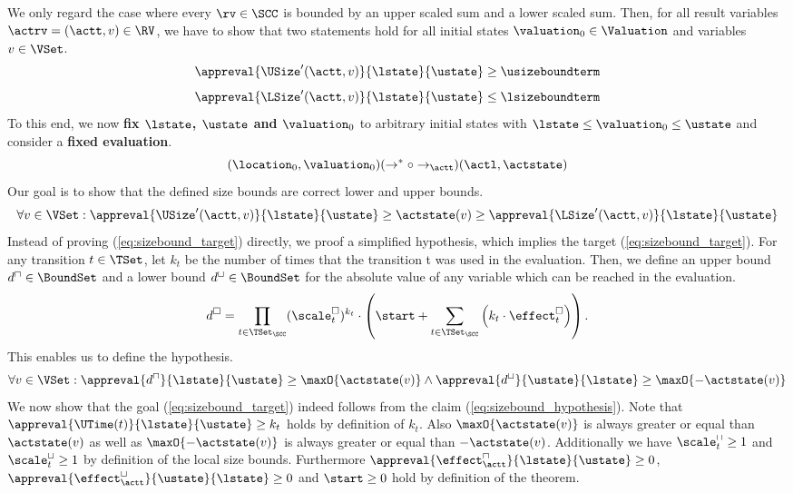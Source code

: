 We only regard the case where every $\rv \in \SCC$ is bounded by an upper scaled sum and a lower scaled sum.
Then, for all result variables $\actrv = (\actt, v) \in \RV$, we have to show that two statements hold for all initial states $\valuation_0 \in \Valuation$ and variables $v \in \VSet$.
\[ \appreval{\USize'(\actt, v)}{\lstate}{\ustate} \geq \usizeboundterm \]
\[ \appreval{\LSize'(\actt, v)}{\lstate}{\ustate} \leq \lsizeboundterm \]
To this end, we now \textbf{fix $\lstate$, $\ustate$ and $\valuation_0$} to arbitrary initial states with $\lstate \leq \valuation_0 \leq \ustate$ and consider a \textbf{fixed evaluation}.
\[ (\location_0, \valuation_0) (\rightarrow^* \circ \rightarrow_\actt) (\actl, \actstate) \]
Our goal is to show that the defined size bounds are correct lower and upper bounds.
\begin{equation} \label{eq:sizebound_target}
  \forall v \in \VSet: \appreval{\USize'(\actt, v)}{\lstate}{\ustate} \geq \actstate(v) \geq \appreval{\LSize'(\actt, v)}{\lstate}{\ustate}
\end{equation}
Instead of proving (\ref{eq:sizebound_target}) directly, we proof a simplified hypothesis, which implies the target (\ref{eq:sizebound_target}).
For any transition $t \in \TSet$, let $k_t$ be the number of times that the transition t was used in the evaluation.
Then, we define an upper bound $d^\sqcap \in \BoundSet$ and a lower bound $d^\sqcup \in \BoundSet$ for the absolute value of any variable which can be reached in the evaluation.
\[ d^\square = \prod_{t \in \TSet_\SCC} (\scale^\square_t)^{k_t} \cdot \left( \start + \sum_{t \in \TSet_\SCC} \left( k_t \cdot \effect^\square_t \right) \right). \]
This enables us to define the hypothesis.
\begin{equation} \label{eq:sizebound_hypothesis}
  \forall v \in \VSet: \appreval{d^\sqcap}{\lstate}{\ustate} \geq \maxO{\actstate(v)} \wedge \appreval{d^\sqcup}{\ustate}{\lstate} \geq \maxO{-\actstate(v)}
\end{equation}
We now show that the goal (\ref{eq:sizebound_target}) indeed follows from the claim (\ref{eq:sizebound_hypothesis}).
Note that $\appreval{\UTime(t)}{\lstate}{\ustate} \geq k_t$ holds by definition of $k_t$.
Also $\maxO{\actstate(v)}$ is always greater or equal than $\actstate(v)$ as well as $\maxO{-\actstate(v)}$ is always greater or equal than $-\actstate(v)$.
Additionally we have $\scale^\sqcap_t \geq 1$ and $\scale^\sqcup_t \geq 1$ by definition of the local size bounds.
Furthermore $\appreval{\effect^\sqcap_\actt}{\lstate}{\ustate} \geq 0$, $\appreval{\effect^\sqcup_\actt}{\ustate}{\lstate} \geq 0$ and $\start \geq 0$ hold by definition of the theorem.
